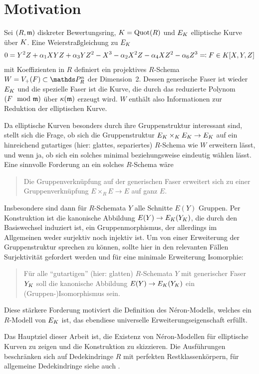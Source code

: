 \chapter{Motivation}

Sei $(R,\mathfrak{m})$ diskreter Bewertungsring, $K=\operatorname{Quot}(R)$ und $E_{K}$
elliptische Kurve über $K$. Eine Weierstraßgleichung zu $E_{K}$
\begin{gather*}
  0 = Y^2 Z + \alpha_1 XYZ + \alpha_3 YZ^2 - X^3 - \alpha_2X^2 Z - \alpha_4 XZ^2 - \alpha_6 Z^3
  \eqqcolon F\in K[X,Y,Z]  
\end{gather*}
mit Koeffizienten in $R$ definiert ein projektives $R$-Schema
$W=V_+(F)\subset\P_R^n$ der Dimension~2. Dessen generische Faser
ist wieder $E_{K}$ und die spezielle Faser ist die Kurve, die durch das
reduzierte Polynom $(F\mod{\mathfrak{m}})$ über $\kappa(\mathfrak{m})$ erzeugt wird.
$W$ enthält also Informationen zur Reduktion der elliptischen
Kurve.

Da elliptische Kurven besonders durch ihre Gruppenstruktur
interessant sind, stellt sich die Frage, ob sich die
Gruppenstruktur $E_{K}\times_{K} E_{K}\to E_{K}$ auf ein hinreichend
gutartiges (hier: glattes, separiertes) $R$-Schema wie $W$ erweitern
lässt, und wenn ja, ob sich ein solches minimal beziehungsweise
eindeutig wählen lässt.
Eine sinnvolle Forderung an ein solches $R$-Schema wäre
\begin{quote}
  Die Gruppenverknüpfung auf der generischen Faser erweitert sich zu
  einer Gruppenverknüpfung $E\times_R E\to E$ auf ganz $E$.
\end{quote}
Insbesondere sind dann für $R$-Schemata $Y$ alle Schnitte $E(Y)$
Gruppen. Per Konstruktion ist die kanonische Abbildung
$E(Y)\to E_{K}(Y_{K})$, die durch den Basiswechsel induziert ist, ein
Gruppenmorphismus, der allerdings im Allgemeinen weder surjektiv noch
injektiv ist. Um von einer Erweiterung der Gruppenstruktur sprechen zu
können, sollte hier in den relevanten Fällen Surjektivität
gefordert werden und für eine minimale Erweiterung Isomorphie:
\begin{quote}
  Für alle \enquote{gutartigen} (hier: glatten) $R$-Schemata $Y$ mit
  generischer Faser $Y_{K}$ soll die kanonische Abbildung
  $E(Y)\to E_{K}(Y_{K})$ ein (Gruppen-)Isomorphismus sein.
\end{quote}
Diese stärkere Forderung motiviert die Definition des
Néron-Modells, welches ein $R$-Modell von $E_{K}$ ist, das ebendiese
universelle Erweiterungseigenschaft erfüllt.

Das Hauptziel dieser Arbeit ist, die Existenz von Néron-Modellen
für elliptische Kurven zu zeigen und die Konstruktion zu skizzieren.
Die Ausführungen beschränken sich auf Dedekindringe $R$ mit perfekten
Restklassenkörpern, für allgemeine Dedekindringe siehe auch
\cite{nonperfect}.

